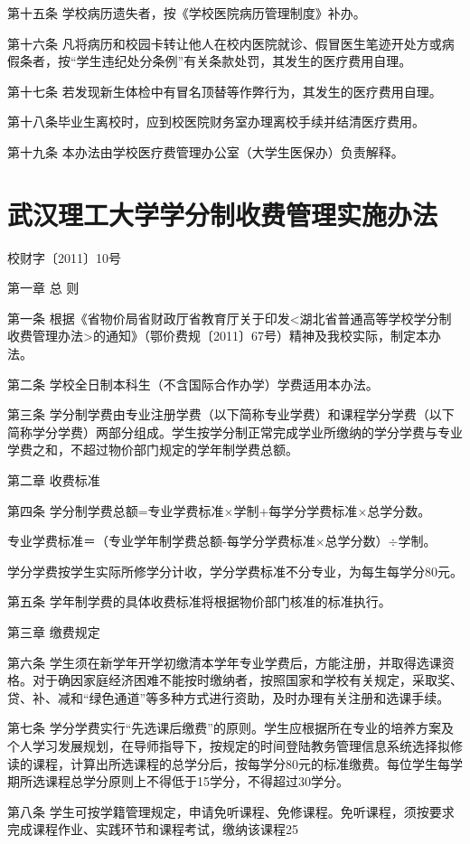 \documentclass[UTF8,12pt,a4paper]{report}
\begin{document}
第十五条 学校病历遗失者，按《学校医院病历管理制度》补办。

第十六条 凡将病历和校园卡转让他人在校内医院就诊、假冒医生笔迹开处方或病假条者，按“学生违纪处分条例”有关条款处罚，其发生的医疗费用自理。

第十七条 若发现新生体检中有冒名顶替等作弊行为，其发生的医疗费用自理。

第十八条毕业生离校时，应到校医院财务室办理离校手续并结清医疗费用。

第十九条 本办法由学校医疗费管理办公室（大学生医保办）负责解释。

\chapter{武汉理工大学学分制收费管理实施办法}
校财字〔2011〕10号

第一章 总 则

第一条 根据《省物价局省财政厅省教育厅关于印发<湖北省普通高等学校学分制收费管理办法>的通知》（鄂价费规〔2011〕67号）精神及我校实际，制定本办法。

第二条 学校全日制本科生（不含国际合作办学）学费适用本办法。

第三条 学分制学费由专业注册学费（以下简称专业学费）和课程学分学费（以下简称学分学费）两部分组成。学生按学分制正常完成学业所缴纳的学分学费与专业学费之和，不超过物价部门规定的学年制学费总额。

第二章 收费标准

第四条 学分制学费总额=专业学费标准$\times$学制+每学分学费标准$\times$总学分数。

专业学费标准＝（专业学年制学费总额-每学分学费标准$\times$总学分数）$\div$学制。

学分学费按学生实际所修学分计收，学分学费标准不分专业，为每生每学分80元。

第五条 学年制学费的具体收费标准将根据物价部门核准的标准执行。

第三章 缴费规定

第六条 学生须在新学年开学初缴清本学年专业学费后，方能注册，并取得选课资格。对于确因家庭经济困难不能按时缴纳者，按照国家和学校有关规定，采取奖、贷、补、减和“绿色通道”等多种方式进行资助，及时办理有关注册和选课手续。

第七条 学分学费实行“先选课后缴费”的原则。学生应根据所在专业的培养方案及个人学习发展规划，在导师指导下，按规定的时间登陆教务管理信息系统选择拟修读的课程，计算出所选课程的总学分后，按每学分80元的标准缴费。每位学生每学期所选课程总学分原则上不得低于15学分，不得超过30学分。

第八条 学生可按学籍管理规定，申请免听课程、免修课程。免听课程，须按要求完成课程作业、实践环节和课程考试，缴纳该课程25%
\end{document}
